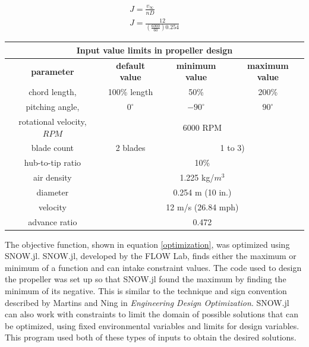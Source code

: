 \documentclass[journal ]{new-aiaa}
\begin{document}
\begin{equation}
	\begin{aligned}
	\label{Jequations}
	J = \frac{v_{\infty}}{n D} \\
	J = \frac{12}{(\frac{6000}{60}) 0.254}
	\end{aligned}
\end{equation}

\begin{table}[H]
\label{constraintstab}
\centering
\begin{tabular}{| c | c | c | c |}
	\multicolumn{4}{c}{Input value limits in propeller design} \\ \hline
  	 \textbf{parameter} & \textbf{default value} & \textbf{minimum value} & \textbf{maximum value} \\ \hline
	 chord length, & 100\% length & 50\% & 200\% \\ \hline
	 pitching angle, & $0^{\circ}$ & $-90^{\circ}$ & $90^{\circ}$ \\ \hline \hline
	 rotational velocity, $RPM$ & \multicolumn{3}{c|}{6000 RPM} \\ \hline
	 blade count & 2 blades & \multicolumn{2}{c|}{1 to 3)}\\ \hline
	 hub-to-tip ratio & \multicolumn{3}{c|}{10\%} \\ \hline
	 air density & \multicolumn{3}{c|}{1.225 kg/$m^{3}$} \\ \hline
	 diameter & \multicolumn{3}{c|}{0.254 m (10 in.)} \\ \hline
	 velocity & \multicolumn{3}{c|}{12 m/s (26.84 mph)} \\ \hline
	 advance ratio & \multicolumn{3}{c|}{0.472} \\ \hline
\end{tabular}
\end{table}

The objective function, shown in equation \ref{optimization}, was optimized using SNOW.jl. SNOW.jl, developed by the FLOW Lab, finds either the maximum or minimum of a function and can intake constraint values. The code used to design the propeller was set up so that SNOW.jl found the maximum by finding the minimum of its negative. This is similar to the technique and sign convention described by Martins and Ning in \emph{Engineering Design Optimization}\cite{EngDesOpt}. SNOW.jl can also work with constraints to limit the domain of possible solutions that can be optimized, using fixed environmental variables and limits for design variables. This program used both of these types of inputs to obtain the desired solutions.
\end{document}
